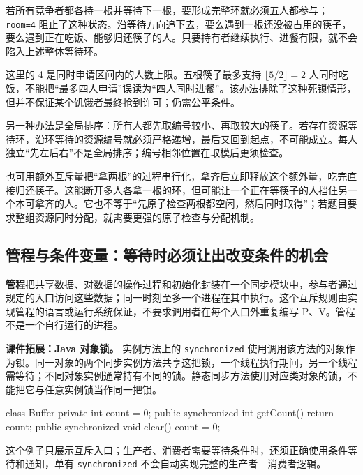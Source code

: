 若所有竞争者都各持一根并等待下一根，要形成完整环就必须五人都参与；\texttt{room=\allowbreak{}4} 阻止了这种状态。沿等待方向追下去，要么遇到一根还没被占用的筷子，要么遇到正在吃饭、能够归还筷子的人。只要持有者继续执行、进餐有限，就不会陷入上述整体等待环。

这里的 4 是同时申请区间内的人数上限。五根筷子最多支持 \(\lfloor5/2\rfloor=2\) 人同时吃饭，不能把``最多四人申请''误读为``四人同时进餐''。该办法排除了这种死锁情形，但并不保证某个饥饿者最终抢到许可；仍需公平条件。

另一种办法是全局排序：所有人都先取编号较小、再取较大的筷子。若存在资源等待环，沿环等待的资源编号就必须严格递增，最后又回到起点，不可能成立。每人独立``先左后右''不是全局排序；编号相邻位置在取模后更须检查。

也可用额外互斥量把``拿两根''的过程串行化，拿齐后立即释放这个额外量，吃完直接归还筷子。这能断开多人各拿一根的环，但可能让一个正在等筷子的人挡住另一个本可拿齐的人。它也不等于``先原子检查两根都空闲，然后同时取得''；若题目要求整组资源同时分配，就需要更强的原子检查与分配机制。

\subsection{管程与条件变量：等待时必须让出改变条件的机会}\label{OS02-monitor}

\textbf{管程}把共享数据、对数据的操作过程和初始化封装在一个同步模块中，参与者通过规定的入口访问这些数据；同一时刻至多一个进程在其中执行。这个互斥规则由实现管程的语言或运行系统保证，不要求调用者在每个入口外重复编写 P、V。管程不是一个自行运行的进程。

\textbf{课件拓展：Java 对象锁。} 实例方法上的 \texttt{synchronized} 使用调用该方法的对象作为锁。同一对象的两个同步实例方法共享这把锁，一个线程执行期间，另一个线程需等待；不同对象实例通常持有不同的锁。静态同步方法使用对应类对象的锁，不能把它与任意实例锁当作同一把锁。

\par\medskip\noindent\begin{minipage}{\linewidth}
\begin{codeblock}[language={}]
class Buffer {
    private int count = 0;
    public synchronized int getCount() { return count; }
    public synchronized void clear() { count = 0; }
}
\end{codeblock}
\end{minipage}\par\medskip

这个例子只展示互斥入口；生产者、消费者需要等待条件时，还须正确使用条件等待和通知，单有 \texttt{synchronized} 不会自动实现完整的生产者---消费者逻辑。


